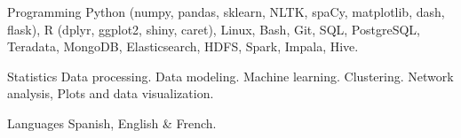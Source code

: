 


\begin{cvskills}


\cvskill
{Programming} %
{Python (numpy, pandas, sklearn, NLTK, spaCy, matplotlib, dash, flask), R (dplyr, ggplot2, shiny, caret), Linux, Bash, Git,} %
\cvskill
{}
{SQL, PostgreSQL, Teradata, MongoDB, Elasticsearch, HDFS, Spark, Impala, Hive.} %


\cvskill
{Statistics} %
{Data processing. Data modeling. Machine learning. Clustering. Network analysis, Plots and data visualization.} %


\cvskill
{Languages} %
{Spanish, English \& French.} %







\end{cvskills}
